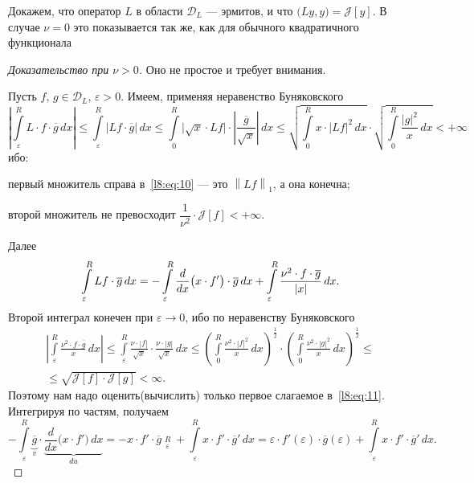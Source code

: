 \documentclass[12pt,a4paper,openany,fleqn]{book}
\newcommand{\J}{\ensuremath{\mathcal{J}}}
\newcommand{\mc}[1]{\ensuremath{\mathcal{#1}}}
\newcommand{\der}[2]{\ensuremath{\frac{d#1}{d#2}}}
\newcommand{\eps}{\varepsilon}
\newcommand{\norm}[1]{\ensuremath{\left\|#1\right\|}}
\theoremstyle{definition}
\begin{document}
	Докажем, что оператор $L$ в области $\mc{D}_L$ --- эрмитов, и что $\big(Ly,y\big)=\J[y]$. В случае $\nu=0$ это показывается так же, как для обычного квадратичного функционала
	\begin{proof}[Доказательство при $\nu>0$]
		Оно не простое и требует внимания.
		
		Пусть $f,\,g\in\mc{D}_L$, $\eps>0$. Имеем, применяя неравенство Буняковского
		\begin{equation}\label{l8:eq:10}
			\left|\int\limits_{\eps}^R L\cdot f\cdot\overline{g}\,dx\right|\leqslant\int\limits_{\eps}^R\big|Lf\cdot\overline{g}\big|\,dx\leqslant\int\limits_{0}^R\big|\sqrt{x}\cdot Lf\big|\cdot\left|\frac{\overline{g}}{\sqrt{x}}\right|\,dx\leqslant\sqrt{\int\limits_{0}^R x\cdot\big|Lf\big|^2\,dx}\cdot\sqrt{\int\limits_{0}^R \frac{|g|^2}{x}\,dx}<+\infty
		\end{equation}
		ибо:
		\begin{enumeraterm}
			\item первый множитель справа в~\eqref{l8:eq:10} --- это $\norm{Lf}_1$, а она конечна;
			\item второй множитель не превосходит $\dfrac{1}{\nu^2}\cdot\J[f]<+\infty$.
		\end{enumeraterm}
		Далее
		\begin{equation}\label{l8:eq:11}
			\hfill\int\limits_{\eps}^R Lf\cdot\overline{g}\,dx=-\int\limits_{\eps}^R\der{}{x}\big(x\cdot f'\big)\cdot\overline{g}\,dx+\int\limits_{\eps}^R\frac{\nu^2\cdot f\cdot\overline{g}}{|x|}\,dx.\hfill
		\end{equation}
		Второй интеграл конечен при $\eps\to0$, ибо по неравенству Буняковского
		\begin{multline}\label{l8:eq:12}
			\left|\int\limits_{\eps}^R\frac{\nu^2\cdot f\cdot\overline{g}}{x}\,dx\right|\leqslant\int\limits_{\eps}^R\frac{\nu\cdot|f|}{\sqrt{x}}\cdot\frac{\nu\cdot|g|}{\sqrt{x}}\,dx\leqslant\left(\int\limits_{0}^R\frac{\nu^2\cdot|f|^2}{x}\,dx\right)^{\!\!\!\textstyle\frac{1}{2}}\cdot\left(\int\limits_{0}^R\frac{\nu^2\cdot|g|^2}{x}\,dx\right)^{\!\!\!\textstyle\frac{1}{2}}\leqslant\\
			\leqslant\sqrt{\J[f]\cdot\J[g]}<\infty.
		\end{multline}
		Поэтому нам надо оценить(вычислить) только первое слагаемое в~\eqref{l8:eq:11}. Интегрируя по частям, получаем
		\begin{equation}\label{l8:eq:13}
			-\int\limits_{\eps}^R\underbrace{\overline{g}}_{v}\cdot\underbrace{\der{}{x}\Big(x\cdot f'\Big)\,dx}_{du}=-x\cdot f'\cdot\overline{g}\mathop{\Big|}\limits_{\eps}^R+\int\limits_{\eps}^R x\cdot f'\cdot\overline{g}'\,dx=\eps\cdot f'(\eps)\cdot\overline{g}(\eps)+\int\limits_{\eps}^R x\cdot f'\cdot\overline{g}'\,dx.

\end{equation}
\end{proof}
\end{document}
